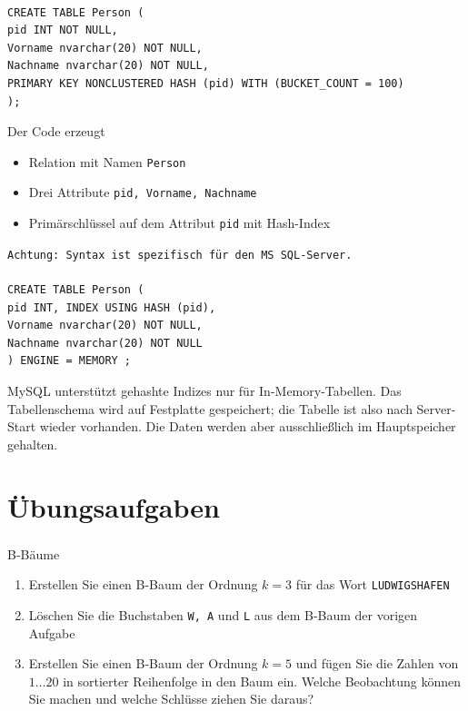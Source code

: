 \begin{frame}[fragile]{\insertsection}
\framesubtitle{\insertsubsection}
\lstset{language=sql}
\lstset{captionpos=b}
\begin{lstlisting}[xleftmargin=3ex, numbers=none, caption=Relation mit gehashtem Primärschlüssel (MS SQL Server)]
CREATE TABLE Person (
pid INT NOT NULL, 
Vorname nvarchar(20) NOT NULL,
Nachname nvarchar(20) NOT NULL,
PRIMARY KEY NONCLUSTERED HASH (pid) WITH (BUCKET_COUNT = 100)
);
\end{lstlisting}
Der Code erzeugt 
\begin{itemize}
\item Relation mit Namen \texttt{Person}
\item Drei Attribute \texttt{pid, Vorname, Nachname}
\item Primärschlüssel auf dem Attribut \texttt{pid} mit Hash-Index
\end{itemize}
\texttt{Achtung: Syntax ist spezifisch für den MS SQL-Server.}
\end{frame}

\begin{frame}[fragile]{\insertsection}
\framesubtitle{\insertsubsection}
\lstset{language=sql}
\lstset{captionpos=b}
\begin{lstlisting}[xleftmargin=3ex, numbers=none, caption=Relation mit gehashtem Primärschlüssel (MySQL)]
CREATE TABLE Person (
pid INT, INDEX USING HASH (pid),
Vorname nvarchar(20) NOT NULL,
Nachname nvarchar(20) NOT NULL
) ENGINE = MEMORY ; 
\end{lstlisting}
MySQL unterstützt gehashte Indizes nur für In-Memory-Tabellen.
\nl
Das Tabellenschema wird auf Festplatte gespeichert; die Tabelle ist also nach Server-Start wieder vorhanden. 
\nl
Die Daten werden aber ausschließlich im Hauptspeicher gehalten.
\end{frame}

\section*{Übungsaufgaben}

\begin{frame}[t]
\frametitle{\insertsection}
\begin{alertblock}{B-B\"aume}
\begin{enumerate}
\item Erstellen Sie einen B-Baum der Ordnung $k=3$ für das Wort \texttt{LUDWIGSHAFEN}
\item Löschen Sie die Buchstaben \texttt{W, A} und \texttt{L} aus dem B-Baum der vorigen Aufgabe
\item Erstellen Sie einen B-Baum der Ordnung $k=5$ und fügen Sie die Zahlen von $1\dots20$ in sortierter Reihenfolge in den Baum ein.
Welche Beobachtung können Sie machen und welche Schlüsse ziehen Sie daraus?
\end{enumerate}
\end{alertblock}
\end{frame}

